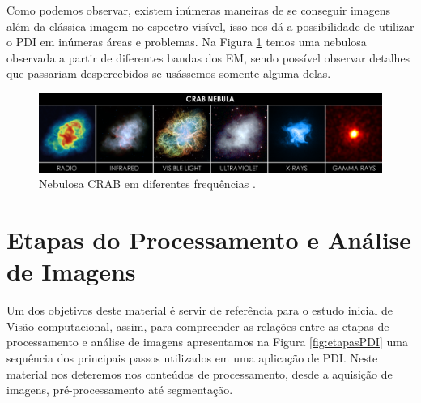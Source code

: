 \documentclass[
  brazilian,
]{book}
\begin{document}
Como podemos observar, existem inúmeras maneiras de se conseguir imagens além da clássica imagem no espectro visível, isso nos dá a possibilidade de utilizar o PDI em inúmeras áreas e problemas. Na Figura \ref{fig:aplicacoes} temos uma nebulosa observada a partir de diferentes bandas dos EM, sendo possível observar detalhes que passariam despercebidos se usássemos somente alguma delas.



\begin{figure}

{\centering \includegraphics[width=0.9\linewidth]{imagens/01-introducao/aplicacoes} 

}

\caption{Nebulosa CRAB em diferentes frequências \autocite{img:nebulosa}.}\label{fig:aplicacoes}
\end{figure}

\hypertarget{etapas-do-processamento-e-anuxe1lise-de-imagens}{%
\section{Etapas do Processamento e Análise de Imagens}\label{etapas-do-processamento-e-anuxe1lise-de-imagens}}

Um dos objetivos deste material é servir de referência para o estudo inicial de Visão computacional, assim, para compreender as relações entre as etapas de processamento e análise de imagens apresentamos na Figura \ref{fig:etapasPDI} uma sequência dos principais passos utilizados em uma aplicação de PDI. Neste material nos deteremos nos conteúdos de processamento, desde a aquisição de imagens, pré-processamento até segmentação.
\end{document}
